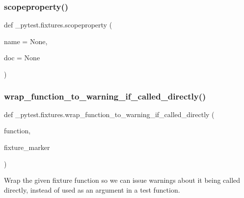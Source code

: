 \subsubsection{\texorpdfstring{scopeproperty()}{scopeproperty()}}
{\footnotesize\ttfamily def \+\_\+pytest.\+fixtures.\+scopeproperty (\begin{DoxyParamCaption}\item[{}]{name = {\ttfamily None},  }\item[{}]{doc = {\ttfamily None} }\end{DoxyParamCaption})}

\mbox{\label{namespace__pytest_1_1fixtures_a52468614fd8fd54547e07684ef6de052}} 
\subsubsection{\texorpdfstring{wrap\+\_\+function\+\_\+to\+\_\+warning\+\_\+if\+\_\+called\+\_\+directly()}{wrap\_function\_to\_warning\_if\_called\_directly()}}
{\footnotesize\ttfamily def \+\_\+pytest.\+fixtures.\+wrap\+\_\+function\+\_\+to\+\_\+warning\+\_\+if\+\_\+called\+\_\+directly (\begin{DoxyParamCaption}\item[{}]{function,  }\item[{}]{fixture\+\_\+marker }\end{DoxyParamCaption})}

\begin{DoxyVerb}Wrap the given fixture function so we can issue warnings about it being called directly, instead of
used as an argument in a test function.
\end{DoxyVerb}
 \mbox{\label{namespace__pytest_1_1fixtures_ad7ab41d1dd454c1b1c2c4f638d1def30}} 
